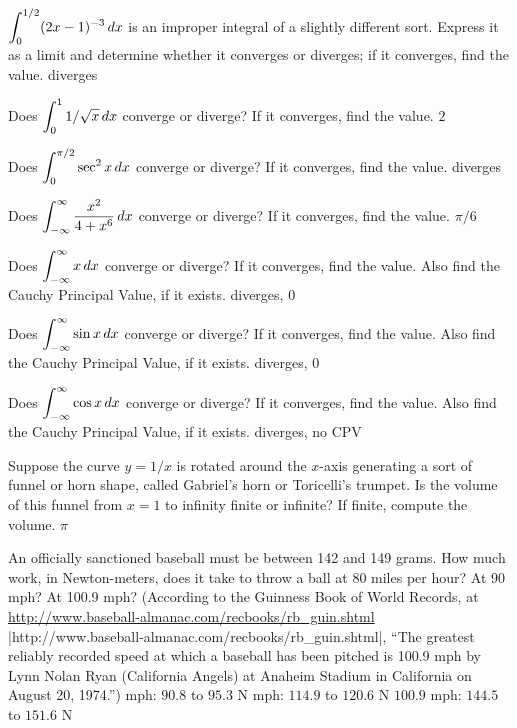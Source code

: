 \exercise $\displaystyle\int_0^{1/2} (2x-1)^{-3}\,dx$ is an improper integral of
a slightly different sort. Express it as a limit and determine whether
it converges or diverges; if 
it converges, find the value.
\answer diverges
\endanswer
\endexercise

\exercise Does $\displaystyle\int_0^1 1/\sqrt{x}\,dx$ converge or diverge? If
it converges, find the value.
\answer $2$
\endanswer

\endexercise

\exercise Does $\displaystyle\int_0^{\pi/2} \sec^2x\,dx$ converge or diverge? If
it converges, find the value.
\answer diverges
\endanswer

\endexercise

\exercise Does $\displaystyle\int_{-\infty}^\infty{x^2\over 4+x^6}\,dx$ 
converge or diverge? If
it converges, find the value.
\answer $\pi/6$
\endanswer

\endexercise

\exercise Does $\displaystyle\int_{-\infty}^\infty x\,dx$ 
converge or diverge? If
it converges, find the value. Also find the Cauchy Principal Value, if
it exists.
\answer diverges, $0$
\endanswer

\endexercise

\exercise Does $\displaystyle\int_{-\infty}^\infty \sin x\,dx$ 
converge or diverge? If
it converges, find the value. Also find the Cauchy Principal Value, if
it exists.
\answer diverges, $0$
\endanswer
\endexercise

\exercise Does $\displaystyle\int_{-\infty}^\infty \cos x\,dx$ 
converge or diverge? If
it converges, find the value. Also find the Cauchy Principal Value, if
it exists.
\answer diverges, no CPV
\endanswer
\endexercise

\exercise \relax
{}
Suppose the curve $y=1/x$ is rotated around the $x$-axis
generating a sort of funnel or horn shape, called {\dfont
  Gabriel's horn\/} or {\dfont Toricelli's
  trumpet}. Is the volume of this funnel
from $x=1$ to infinity finite or infinite? If finite, compute the
volume.  
\answer $\pi$ 
\endanswer
\endexercise

\exercise An officially sanctioned baseball must be between 142 and
149 grams. How much work, in Newton-meters, does it take to throw a
ball at 80 miles per hour? At 90 mph? At 100.9 mph?  (According to the
Guinness Book of World Records, at
\url{http://www.baseball-almanac.com/recbooks/rb_guin.shtml}
{\vb|http://www.baseball-almanac.com/recbooks/rb_guin.shtml|}\endurl, ``The
greatest reliably recorded speed at which a baseball has been pitched
is 100.9 mph by Lynn Nolan Ryan (California Angels) at Anaheim Stadium
in California on August 20, 1974.'')
 mph: $90.8$ to $95.3$ N\hfill{} mph: $114.9$ to $120.6$ N\hfill\break
$100.9$ mph: $144.5$ to $151.6$ N
\endanswer
\endexercise

\endexercises
